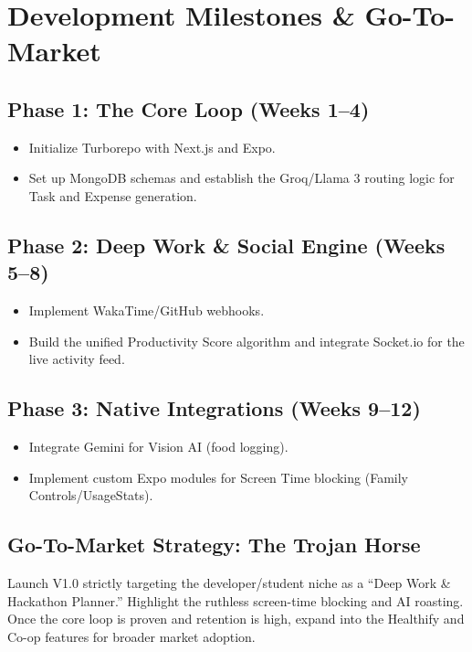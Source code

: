 \documentclass[11pt,oneside]{article}
\begin{document}
\section{Development Milestones \& Go-To-Market}

\subsection{Phase 1: The Core Loop (Weeks 1--4)}

\begin{itemize}
  \item Initialize Turborepo with Next.js and Expo.
  \item Set up MongoDB schemas and establish the Groq/Llama 3 routing logic for Task and Expense generation.
\end{itemize}

\subsection{Phase 2: Deep Work \& Social Engine (Weeks 5--8)}

\begin{itemize}
  \item Implement WakaTime/GitHub webhooks.
  \item Build the unified Productivity Score algorithm and integrate Socket.io for the live activity feed.
\end{itemize}

\subsection{Phase 3: Native Integrations (Weeks 9--12)}

\begin{itemize}
  \item Integrate Gemini for Vision AI (food logging).
  \item Implement custom Expo modules for Screen Time blocking (Family Controls/UsageStats).
\end{itemize}

\subsection{Go-To-Market Strategy: The Trojan Horse}

Launch V1.0 strictly targeting the developer/student niche as a ``Deep Work \& Hackathon Planner.'' Highlight the ruthless screen-time blocking and AI roasting. Once the core loop is proven and retention is high, expand into the Healthify and Co-op features for broader market adoption.
\end{document}
